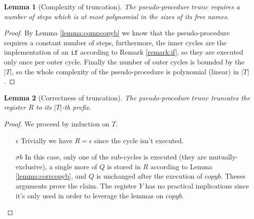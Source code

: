 \documentclass[10pt]{amsart}
\newcommand{\sone}{\sigma}
\newcommand{\If}{\mathtt{if}}
\newtheorem{lemma}{Lemma}
\begin{document}
\begin{lemma}[Complexity of truncation]
\label{lemma:comptrunc}
The pseudo-procedure $trunc$ requires a number of steps which is at most polynomial in the sizes of its free names.
\end{lemma}

\begin{proof}
By Lemma \ref{lemma:compcopyb} we know that the pseudo-procedure requires a constant number of steps, furthermore, the inner cycles are the implementation of an $\If$ according to Remark \ref{remark:if}, so they are executed only once per outer cycle. Finally the number of outer cycles is bounded by the $|T|$, so the whole complexity of the pseudo-procedure is polynomial (linear) in $|T|$.
\end{proof}

\begin{lemma}[Correctness of truncation]
\label{lemma:corrtrunc}
The pseudo-procedure $trunc$ truncates the register $R$ to its $|T|$-th prefix.
\end{lemma}

\begin{proof}
We proceed by induction on $T$.
\begin{itemize}
\item[$\epsilon$] Trivially we have $R=\epsilon$ since the cycle isn't executed.
\item[$\sone b$] In this case, only one of the sub-cycles is executed (they are mutually-exclusive), a single more of $Q$ is stored in $R$ according to Lemma \ref{lemma:corrcopyb}, and $Q$ is unchanged after the execution of $copyb$. Theses arguments prove the claim. The register $Y$ has no practical implications since it's only used in order to leverage the lemmas on $copyb$.
\end{itemize}
\end{proof}
\end{document}
